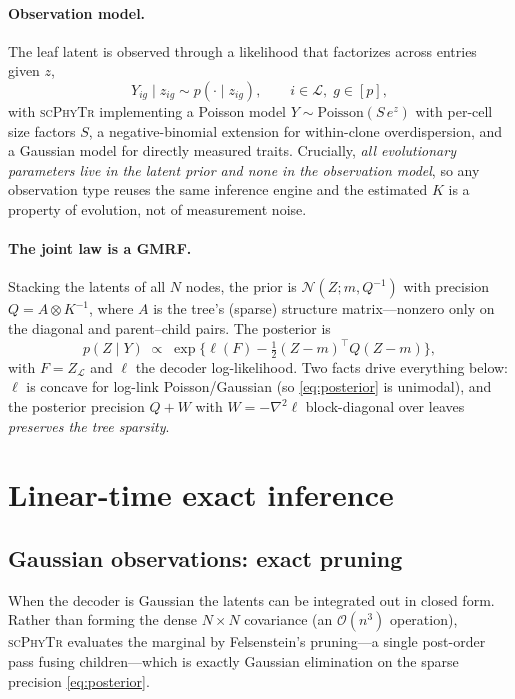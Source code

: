 \documentclass[11pt]{article}
\newcommand{\scphytr}{\textsc{scPhyTr}}
\newcommand{\N}{\mathcal{N}}
\newcommand{\bigO}{\mathcal{O}}
\begin{document}
\paragraph{Observation model.} The leaf latent is observed through a likelihood that
factorizes across entries given $z$,
\begin{equation}
Y_{ig}\mid z_{ig} \sim p(\cdot\mid z_{ig}),\qquad
i\in\mathcal L,\; g\in[p],
\end{equation}
with \scphytr{} implementing a Poisson model $Y\sim\mathrm{Poisson}(S\,e^{z})$ with per-cell
size factors $S$, a negative-binomial extension for within-clone overdispersion, and a
Gaussian model for directly measured traits. Crucially, \emph{all evolutionary parameters live
in the latent prior and none in the observation model}, so any observation type reuses the
same inference engine and the estimated $K$ is a property of evolution, not of measurement
noise.

\paragraph{The joint law is a GMRF.} Stacking the latents of all $N$ nodes, the prior is
$\N(Z;m,Q^{-1})$ with precision $Q=A\otimes K^{-1}$, where $A$ is the tree's (sparse)
structure matrix---nonzero only on the diagonal and parent--child pairs. The posterior is
\begin{equation}
p(Z\mid Y)\;\propto\;\exp\!\Big\{\ell(F)-\tfrac12 (Z-m)^\top Q (Z-m)\Big\},
\label{eq:posterior}
\end{equation}
with $F=Z_{\mathcal L}$ and $\ell$ the decoder log-likelihood. Two facts drive everything
below: $\ell$ is concave for log-link Poisson/Gaussian (so \eqref{eq:posterior} is unimodal),
and the posterior precision $Q+W$ with $W=-\nabla^2\ell$ block-diagonal over leaves
\emph{preserves the tree sparsity}.

\section{Linear-time exact inference}
\label{sec:inference}

\subsection{Gaussian observations: exact pruning}
When the decoder is Gaussian the latents can be integrated out in closed form. Rather than
forming the dense $N\!\times\!N$ covariance (an $\bigO(n^3)$ operation), \scphytr{} evaluates
the marginal by Felsenstein's pruning---a single post-order pass fusing children---which is
exactly Gaussian elimination on the sparse precision \eqref{eq:posterior}.
\end{document}
